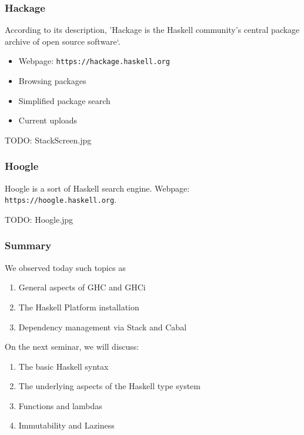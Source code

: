 \documentclass[10pt,pdf,utf8,russian,aspectratio=169]{beamer}
\begin{document}
\begin{frame}
  \frametitle{Hackage}

  According to its description, 'Hackage is the Haskell community's central package archive of open source software`.

  \begin{itemize}
    \item Webpage: \verb"https://hackage.haskell.org"
    \item Browsing packages
    \item Simplified package search
    \item Current uploads
  \end{itemize}

  TODO: StackScreen.jpg
\end{frame}

\begin{frame}
  \frametitle{Hoogle}

  Hoogle is a sort of Haskell search engine. Webpage: \verb"https://hoogle.haskell.org".

  TODO: Hoogle.jpg
\end{frame}

\begin{frame}
  \frametitle{Summary}

  We observed today such topics as

  \begin{enumerate}
    \item General aspects of GHC and GHCi
    \item The Haskell Platform installation
    \item Dependency management via Stack and Cabal
  \end{enumerate}

  \vspace{\baselineskip}

  On the next seminar, we will discuss:

  \begin{enumerate}
    \item The basic Haskell syntax
    \item The underlying aspects of the Haskell type system
    \item Functions and lambdas
    \item Immutability and Laziness
  \end{enumerate}
\end{frame}
\end{document}
